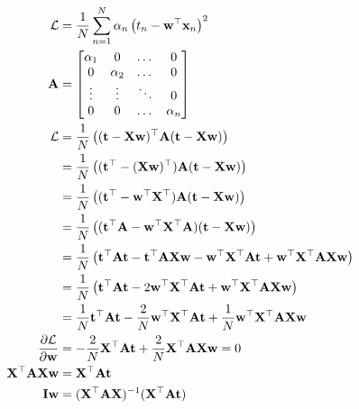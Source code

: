 \documentclass[10pt]{article}
\begin{document}
\begin{itemize}
\begin{eqnarray*}
\begin{aligned}
\mathcal{L} &= {1 \over N} \sum_{n=1}^N \alpha_n \left( t_n - \mathbf{w}^\top \mathbf{x}_n \right)^2
\\
\mathbf{A} &=
	\begin{bmatrix}
	\alpha_{1} & 0 & \dots & 0
	\\
	0 & \alpha_{2} & \dots & 0
	\\
	\vdots & \vdots & \ddots & 0
	\\
	0 & 0 & \dots & \alpha_{n}
	\end{bmatrix}
\\
\mathcal{L} &=  {1 \over N} \left( 
  (\mathbf{t} - \mathbf{X} \mathbf{w})^\top \mathbf{A} (\mathbf{t} - \mathbf{X} \mathbf{w}) 
  \right)
\\
&= {1 \over N} \left(
  (\mathbf{t}^\top - (\mathbf{X} \mathbf{w})^\top) \mathbf{A} (\mathbf{t} - \mathbf{X} \mathbf{w})
  \right)
\\
&= {1 \over N} \left(
  ( \mathbf{t}^\top - \mathbf{w}^\top \mathbf{X}^\top ) \mathbf{A} (\mathbf{t} - \mathbf{X} \mathbf{w})
  \right)
\\
&= {1 \over N} \left(
  ( \mathbf{t}^\top \mathbf{A} - \mathbf{w}^\top \mathbf{X}^\top \mathbf{A}) (\mathbf{t} - \mathbf{X} \mathbf{w})
  \right)
\\
&= {1 \over N} \left(
  \mathbf{t}^\top \mathbf{A} \mathbf{t} 
  - \mathbf{t}^\top \mathbf{A} \mathbf{X} \mathbf{w} 
  - \mathbf{w}^\top \mathbf{X}^\top \mathbf{A} \mathbf{t}
  + \mathbf{w}^\top \mathbf{X}^\top \mathbf{A} \mathbf{X} \mathbf{w}
  \right)
\\
&= {1 \over N} \left(
  \mathbf{t}^\top \mathbf{A} \mathbf{t} 
  - 2 \mathbf{w}^\top \mathbf{X}^\top \mathbf{A} \mathbf{t}
  + \mathbf{w}^\top \mathbf{X}^\top \mathbf{A} \mathbf{X} \mathbf{w}
  \right)
\\
&= {1 \over N} \mathbf{t}^\top \mathbf{A} \mathbf{t} 
  - {2 \over N}  \mathbf{w}^\top \mathbf{X}^\top \mathbf{A} \mathbf{t}
  + {1 \over N} \mathbf{w}^\top \mathbf{X}^\top \mathbf{A} \mathbf{X} \mathbf{w}
\\
\frac { \partial \mathcal{L}} {\partial \mathbf{w}} 
  &= - {2 \over N} \mathbf{X}^\top \mathbf{A} \mathbf{t} 
  + {2 \over N} \mathbf{X}^\top \mathbf{A} \mathbf{X} \mathbf{w} = 0
\\
\mathbf{X}^\top \mathbf{A} \mathbf{X} \mathbf{w}
  &= \mathbf{X}^\top \mathbf{A} \mathbf{t} 
\\
\mathbf{I} \mathbf{w} &= (\mathbf{X}^\top \mathbf{A} \mathbf{X})^{-1}  (\mathbf{X}^\top \mathbf{A} \mathbf{t})
\end{aligned}
\end{eqnarray*}

\end{itemize}
\end{document}
